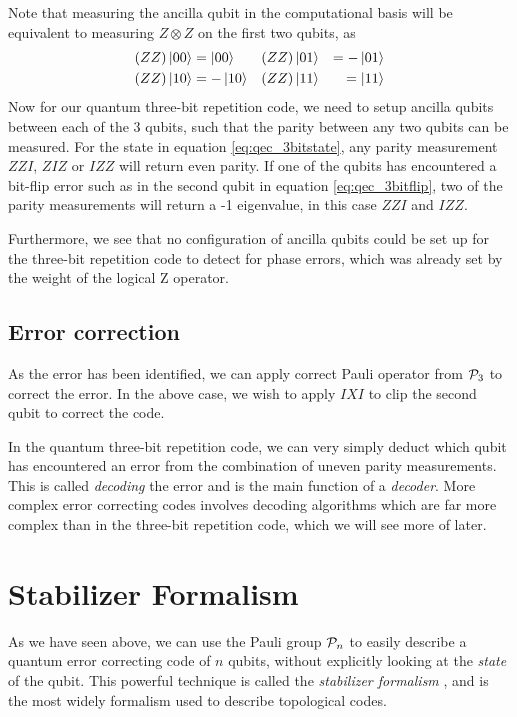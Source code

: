 Note that measuring the ancilla qubit in the computational basis will be equivalent to measuring $Z\otimes Z$ on the first two qubits, as
\begin{equation}
\begin{aligned}
    (ZZ)\ket{00} &= \ket{00} && (ZZ)\ket{01} &= -\ket{01} \\
    (ZZ)\ket{10} &= -\ket{10} && (ZZ)\ket{11} &= \ket{11}
\end{aligned}
\end{equation}
Now for our quantum three-bit repetition code, we need to setup ancilla qubits between each of the 3 qubits, such that the parity between any two qubits can be measured. For the state in equation \eqref{eq:qec_3bitstate}, any parity measurement $ZZI$, $ZIZ$ or $IZZ$ will return even parity. If one of the qubits has encountered a bit-flip error such as in the second qubit in equation \eqref{eq:qec_3bitflip}, two of the parity measurements will return a -1 eigenvalue, in this case $ZZI$ and $IZZ$.

Furthermore, we see that no configuration of ancilla qubits could be set up for the three-bit repetition code to detect for phase errors, which was already set by the weight of the logical Z operator.

\subsection{Error correction}

As the error has been identified, we can apply correct Pauli operator from $\mathcal{P}_3$ to correct the error. In the above case, we wish to apply $IXI$ to clip the second qubit to correct the code.

In the quantum three-bit repetition code, we can very simply deduct which qubit has encountered an error from the combination of uneven parity measurements. This is called \emph{decoding} the error and is the main function of a \emph{decoder}. More complex error correcting codes involves decoding algorithms which are far more complex than in the three-bit repetition code, which we will see more of later.


\section{Stabilizer Formalism}\label{sec:stabilizerformalism}

As we have seen above, we can use the Pauli group $\mathcal{P}_n$ to easily describe a quantum error correcting code of $n$ qubits, without explicitly looking at the \emph{state} of the qubit. This powerful technique is called the \emph{stabilizer formalism} \cite{gottesman1997stabilizer}, and is the most widely formalism used to describe topological codes.

